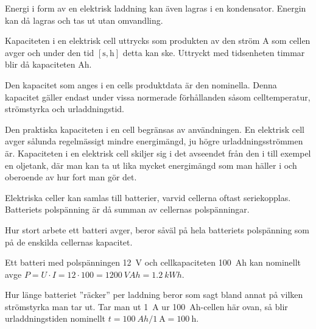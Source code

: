 Energi i form av en elektrisk laddning kan även lagras i en kondensator.
Energin kan då lagras och tas ut utan omvandling.

Kapaciteten i en elektrisk cell uttrycks som produkten av den ström \unit{\ampere}
som cellen avger och under den tid \(\mathrm{[s, h]}\) detta kan ske.
Uttryckt med tidsenheten timmar blir då kapaciteten \unit{Ah}.

Den kapacitet som anges i en cells produktdata är den nominella.
Denna kapacitet gäller endast under vissa normerade förhållanden såsom
celltemperatur, strömstyrka och urladdningstid.

Den praktiska kapaciteten i en cell begränsas av användningen.
En elektrisk cell avger sålunda regelmässigt mindre energimängd, ju högre
urladdningsströmmen är.
Kapaciteten i en elektrisk cell skiljer sig i det avseendet från den i till
exempel en oljetank, där man kan ta ut lika mycket energimängd som man häller i
och oberoende av hur fort man gör det.

Elektriska celler kan samlas till batterier, varvid cellerna oftast
seriekopplas.
Batteriets polspänning är då summan av cellernas polspänningar.

Hur stort arbete ett batteri avger, beror såväl på hela batteriets
polspänning som på de enskilda cellernas kapacitet.

\begin{exempelbox}
Ett batteri med polspänningen \qty{12}{\volt} och cellkapaciteten
\qty{100}{Ah} kan nominellt avge
\(P = U \cdot I = 12 \cdot 100 = \qty{1200}{VAh} = \qty{1,2}{kWh}\).
\end{exempelbox}

Hur länge batteriet ''räcker'' per laddning beror som sagt bland annat på
vilken strömstyrka man tar ut.
Tar man ut \qty{1}{\ampere} ur \qty{100}{Ah}-cellen här ovan, så blir
urladdningstiden nominellt \(t = \qty{100}{Ah}/\qty{1}{\ampere} =
\qty{100}{\hour}\).
